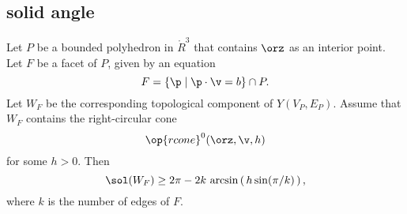 \subsection{solid angle}
%
%


\begin{lemma}[]\label{lemma:ngon} 
Let $P$ be a bounded polyhedron in $\ring{R}^3$ that contains $\orz$
as an interior point.  Let $F$ be a facet of $P$, given by an
equation
\[  
F = \{\p \mid \p \cdot \v = b\} \cap P.
\]  
Let $W_F$ be the corresponding topological component of $Y(V_P,E_P)$.  
Assume that $W_F$ contains the right-circular cone 
\[  
\op{rcone}^0(\orz,\v,h)
\] 
for some $h>0$.
Then 
\[  
\sol(W_F) \ge 
2\pi - 2 k \,\arcsin\left(\,h\sin(\pi/k)\,\right),
\] 
where $k$ is the number of edges of $F$.
\end{lemma}

%


